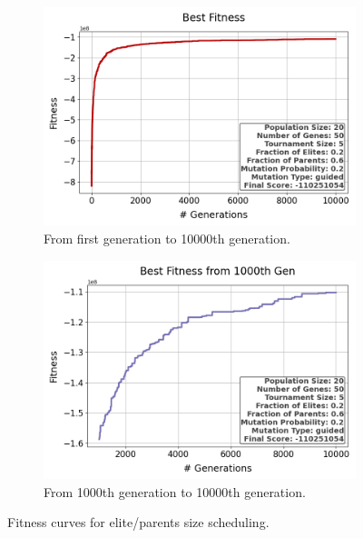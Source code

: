\documentclass{assignment}
\begin{document}
\begin{figure}[H]
    \begin{subfigure}{0.5\textwidth}
        \includegraphics[width=\textwidth]{figures/best_fitness_outputFRAC_20_50_5_0.2_0.6_0.2_guided.png}
        \caption{From first generation to 10000th generation.}
    \end{subfigure}\hfill
    \begin{subfigure}{0.5\textwidth}
        \includegraphics[width=\textwidth]{figures/best_fitness_1000_outputFRAC_20_50_5_0.2_0.6_0.2_guided.png}
        \caption{From 1000th generation to 10000th generation.}
    \end{subfigure}
    \caption{Fitness curves for elite/parents size scheduling.}
\label{fig:schedule_fit}
\end{figure}
\end{document}
